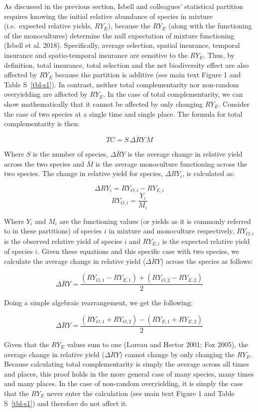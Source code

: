 \documentclass[
  letterpaper,
  DIV=11,
  numbers=noendperiod]{scrartcl}
\begin{document}
As discussed in the previous section, Isbell and colleagues' statistical
partition requires knowing the initial relative abundance of species in
mixture (i.e.~expected relative yields, \(RY_{E}\)), because the
\(RY_{E}\) (along with the functioning of the monocultures) determine
the null expectation of mixture functioning (Isbell et al. 2018).
Specifically, average selection, spatial insurance, temporal insurance
and spatio-temporal insurance are sensitive to the \(RY_{E}\). Thus, by
definition, total insurance, total selection and the net biodiversity
effect are also affected by \(RY_{E}\) because the partition is additive
(see main text Figure 1 and Table S~\ref{tbl-s1}). In contrast, neither
total complementarity nor non-random overyielding are affected by
\(RY_{E}\). In the case of total complementarity, we can show
mathematically that it cannot be affected by only changing \(RY_{E}\).
Consider the case of two species at a single time and single place. The
formula for total complementarity is then:

\[
TC = S \, \overline{\Delta RY} \, \overline{M} \tag{Equation S6}
\]

Where \(S\) is the number of species, \(\overline{\Delta RY}\) is the
average change in relative yield across the two species and
\(\overline{M}\) is the average monoculture functioning across the two
species. The change in relative yield for species, \(\Delta RY_i\), is
calculated as:

\[
\Delta RY_i = RY_{O,i} - RY_{E,i}  
\] \[
RY_{O,i} = \frac{Y_i}{M_i} \tag{Equation S7}
\]

Where \(Y_i\) and \(M_i\) are the functioning values (or yields as it is
commonly referred to in these partitions) of species \(i\) in mixture
and monoculture respectively, \(RY_{O,i}\) is the observed relative
yield of species \(i\) and \(RY_{E,i}\) is the expected relative yield
of species \(i\). Given these equations and this specific case with two
species, we calculate the average change in relative yield
(\(\overline{\Delta RY}\)) across the species as follows:

\[
\overline{\Delta RY} = \frac{(RY_{O,1} - RY_{E,1}) + (RY_{O,2} - RY_{E,2})}{2} \tag{Equation S8}
\]

Doing a simple algebraic rearrangement, we get the following:

\[
\overline{\Delta RY} = \frac{(RY_{O,1} + RY_{O,2}) - (RY_{E,1} + RY_{E,2})}{2} \tag{Equation S9}
\]

Given that the \(RY_E\) values sum to one (Loreau and Hector 2001; Fox
2005), the average change in relative yield (\(\overline{\Delta RY}\))
cannot change by only changing the \(RY_E\). Because calculating total
complementarity is simply the average across all times and places, this
proof holds in the more general case of many species, many times and
many places. In the case of non-random overyielding, it is simply the
case that the \(RY_E\) never enter the calculation (see main text Figure
1 and Table S~\ref{tbl-s1}) and therefore do not affect it.
\end{document}
